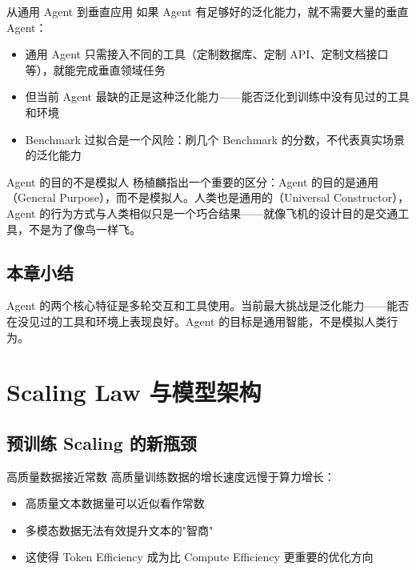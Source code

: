 \documentclass[a4paper]{article}
\begin{document}
\begin{importantbox}{从通用 Agent 到垂直应用}
如果 Agent 有足够好的泛化能力，就不需要大量的垂直 Agent：
\begin{itemize}
    \item 通用 Agent 只需接入不同的工具（定制数据库、定制 API、定制文档接口等），就能完成垂直领域任务
    \item 但当前 Agent 最缺的正是这种泛化能力——能否泛化到训练中没有见过的工具和环境
    \item Benchmark 过拟合是一个风险：刷几个 Benchmark 的分数，不代表真实场景的泛化能力
\end{itemize}
\end{importantbox}

\begin{knowledgebox}{Agent 的目的不是模拟人}
杨植麟指出一个重要的区分：Agent 的目的是通用（General Purpose），而不是模拟人。人类也是通用的（Universal Constructor），Agent 的行为方式与人类相似只是一个巧合结果——就像飞机的设计目的是交通工具，不是为了像鸟一样飞。
\end{knowledgebox}

\subsection{本章小结}

Agent 的两个核心特征是多轮交互和工具使用。当前最大挑战是泛化能力——能否在没见过的工具和环境上表现良好。Agent 的目标是通用智能，不是模拟人类行为。


\section{Scaling Law 与模型架构}

\subsection{预训练 Scaling 的新瓶颈}

\begin{warningbox}{高质量数据接近常数}
高质量训练数据的增长速度远慢于算力增长：
\begin{itemize}
    \item 高质量文本数据量可以近似看作常数
    \item 多模态数据无法有效提升文本的"智商"
    \item 这使得 Token Efficiency 成为比 Compute Efficiency 更重要的优化方向
\end{itemize}
\end{warningbox}
\end{document}
